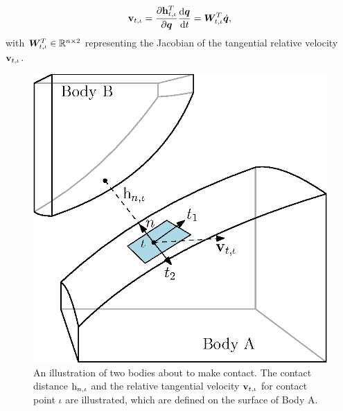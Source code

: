 \documentclass[../DC2019003Bouma.tex]{subfiles}
\begin{document}
\begin{align}
\mathbf{v}_{t,\iota} = \frac{\partial \mathbf{h}^T_{t,\iota}}{\partial{\boldsymbol{q}}}\frac{\text{d}{\boldsymbol{q}}}{\text{d} t} = {\boldsymbol{W}}_{t,\iota}^T\dot{{\boldsymbol{q}}},
\end{align}
with ${\boldsymbol{W}}^T_{t,\iota}\in\mathbb{R}^{n\times 2}$ representing the Jacobian of the tangential relative velocity $\mathbf{v}_{t,\iota}$.
\begin{figure}[bt!]
\centering
\includegraphics[width=.5\textwidth]{contactplanes2.eps}\caption{An illustration of two bodies about to make contact. The contact distance $\mathrm{h}_{n,\iota}$ and the relative tangential velocity $\mathbf{v}_{t,\iota}$ for contact point $\iota$ are illustrated, which are defined on the surface of Body A.} \label{fig:contactplanes}
\end{figure}
\end{document}
